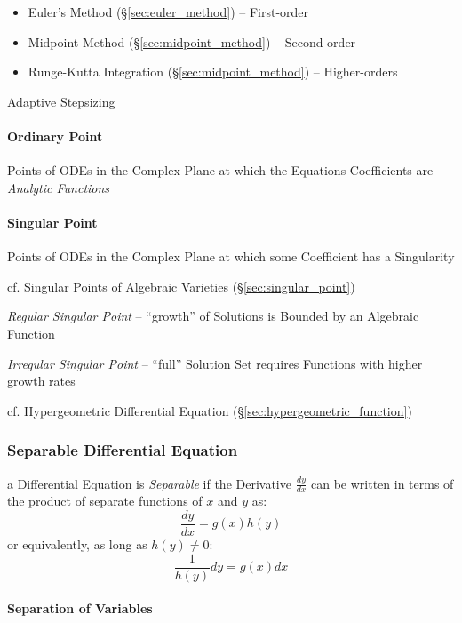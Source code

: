 {\begin{itemize}
\item Euler's Method (\S\ref{sec:euler_method}) -- First-order
\item Midpoint Method (\S\ref{sec:midpoint_method}) -- Second-order
\item Runge-Kutta Integration (\S\ref{sec:midpoint_method}) -- Higher-orders
\end{itemize}

Adaptive Stepsizing



\paragraph{Ordinary Point}\label{sec:ordinary_point}\hfill

Points of ODEs in the Complex Plane at which the Equations Coefficients are
\emph{Analytic Functions}



\paragraph{Singular Point}\label{sec:complex_singular_point}\hfill

Points of ODEs in the Complex Plane at which some Coefficient has a Singularity

\fist cf. Singular Points of Algebraic Varieties (\S\ref{sec:singular_point})

\emph{Regular Singular Point} -- ``growth'' of Solutions is Bounded by an
Algebraic Function

\emph{Irregular Singular Point} -- ``full'' Solution Set requires Functions with
higher growth rates

cf. Hypergeometric Differential Equation (\S\ref{sec:hypergeometric_function})



\subsubsection{Separable Differential Equation}\label{sec:separable}

a Differential Equation is \emph{Separable} if the Derivative $\frac{dy}{dx}$
can be written in terms of the product of separate functions of $x$ and $y$ as:
\[
  \frac{dy}{dx} = g(x)h(y)
\]
or equivalently, as long as $h(y) \neq 0$:
\[
  \frac{1}{h(y)} dy = g(x) dx
\]



\paragraph{Separation of Variables}\label{sec:separation_of_variables}\hfill

}
